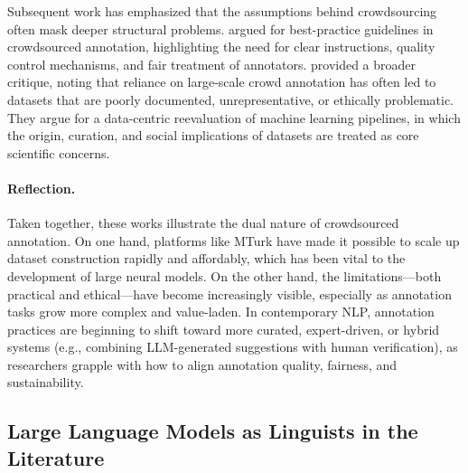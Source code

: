 Subsequent work has emphasized that the assumptions behind crowdsourcing often mask deeper structural problems. \citet{sabou2014corpus} argued for best-practice guidelines in crowdsourced annotation, highlighting the need for clear instructions, quality control mechanisms, and fair treatment of annotators. \citet{paullada2021data} provided a broader critique, noting that reliance on large-scale crowd annotation has often led to datasets that are poorly documented, unrepresentative, or ethically problematic. They argue for a data-centric reevaluation of machine learning pipelines, in which the origin, curation, and social implications of datasets are treated as core scientific concerns.

\paragraph{Reflection.} Taken together, these works illustrate the dual nature of crowdsourced annotation. On one hand, platforms like MTurk have made it possible to scale up dataset construction rapidly and affordably, which has been vital to the development of large neural models. On the other hand, the limitations—both practical and ethical—have become increasingly visible, especially as annotation tasks grow more complex and value-laden. In contemporary NLP, annotation practices are beginning to shift toward more curated, expert-driven, or hybrid systems (e.g., combining LLM-generated suggestions with human verification), as researchers grapple with how to align annotation quality, fairness, and sustainability.

\subsection{Large Language Models as Linguists in the Literature}